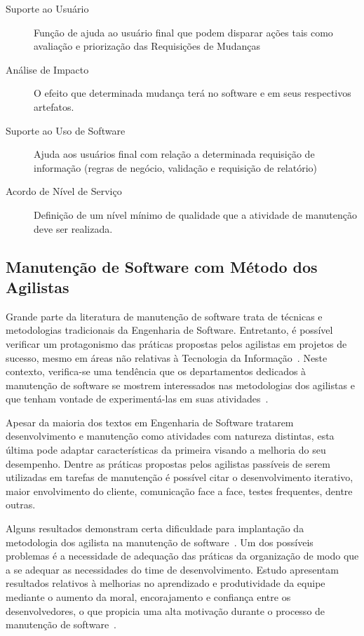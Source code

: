 \begin{description}
	\item[Suporte ao Usuário] Função de ajuda ao usuário final
		que podem disparar ações tais como avaliação e priorização das
		Requisições de Mudanças
   	\item [Análise de Impacto] O efeito que determinada mudança terá no software
		e em seus respectivos artefatos.
	\item [Suporte ao Uso de Software] Ajuda aos
		usuários final com relação a determinada requisição de informação
		(regras de negócio, validação e requisição de relatório)
	\item [Acordo de Nível de Serviço] Definição de um nível mínimo de qualidade que a
		atividade de manutenção deve ser realizada.
\end{description}

\subsection{Manutenção de Software com Método dos Agilistas}
\label{sub:manutenção_de_software_com_método_dos_agilistas}

Grande parte da literatura de manutenção de software trata de técnicas e
metodologias tradicionais da Engenharia de Software. Entretanto, é possível
verificar um protagonismo das práticas propostas pelos agilistas em projetos de
sucesso, mesmo em áreas não relativas à Tecnologia da
Informação~\cite{Serrador2015}. Neste contexto, verifica-se uma tendência que os
departamentos dedicados à manutenção de software se mostrem interessados nas
metodologias dos agilistas e que tenham vontade de experimentá-las em suas
atividades~\cite{Heeager2015}.

Apesar da maioria dos textos em Engenharia de Software tratarem desenvolvimento
e manutenção como atividades com natureza distintas, esta última pode adaptar
características da primeira visando a melhoria do seu desempenho. Dentre as
práticas propostas pelos agilistas passíveis de serem utilizadas em tarefas de
manutenção é possível citar o desenvolvimento iterativo, maior envolvimento do
cliente, comunicação face a face, testes frequentes, dentre outras.

Alguns resultados demonstram certa dificuldade para implantação da metodologia
dos agilista na manutenção de software~\cite{1402140}. Um dos possíveis
problemas é a necessidade de adequação das práticas da organização de modo que a
se adequar as necessidades do time de desenvolvimento.  Estudo apresentam
resultados relativos à melhorias no aprendizado e produtividade da equipe
mediante o aumento da moral, encorajamento e confiança entre os desenvolvedores,
o que propicia uma alta motivação durante o processo de manutenção de
software~\cite{Choudhari:2014:EIM:2557833.2557845}.

